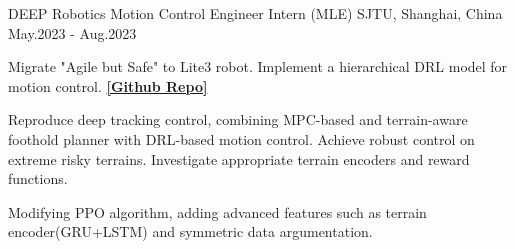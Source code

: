 

\begin{cventries}


  \cventry
  {DEEP Robotics}
  {Motion Control Engineer Intern (MLE)}
  {SJTU, Shanghai, China}
  {May.2023 - Aug.2023}
  {
    \begin{cvitems}
      \item {Migrate "Agile but Safe" to Lite3 robot. Implement a hierarchical DRL model for motion control. \href{https://github.com/priest-yang/ABS-DeepRobotics-Lite3}{\textbf{[Github Repo]}}}
      \item {Reproduce deep tracking control, combining MPC-based and terrain-aware foothold planner with DRL-based motion control. Achieve robust control on extreme risky terrains. Investigate appropriate terrain encoders and reward functions.}
      \item {Modifying PPO algorithm, adding advanced features such as terrain encoder(GRU+LSTM) and symmetric data argumentation.}
    \end{cvitems}
  }




\end{cventries}
